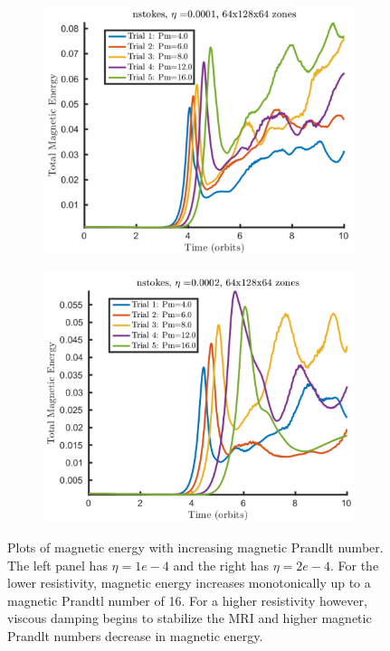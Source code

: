 \begin{figure}[h]
  \begin{subfigure}{.5\textwidth}
    \begin{center}
      \includegraphics [width=\textwidth, angle=0.]{img/nstokes-eta1R1L1_MExyz_TE-0.pdf}
    \end{center}
    \label{fig:nstokesPm1}
  \end{subfigure}
  \begin{subfigure}{.5\textwidth}
    \begin{center}
      \includegraphics [width=\textwidth, angle=0.]{img/nstokes-eta2R1L1_MExyz_TE-0.pdf}
    \end{center}
    \label{fig:nstokesPm2}
  \end{subfigure}
  \label{fig:nstokes}
  \caption{Plots of magnetic energy with increasing magnetic Prandlt number. The left panel has $\eta=1e-4$ and the right has $\eta=2e-4$. For the lower resistivity, magnetic energy increases monotonically up to a magnetic Prandtl number of 16. For a higher resistivity however, viscous damping begins to stabilize the MRI and higher magnetic Prandlt numbers decrease in magnetic energy.}
\end{figure}
